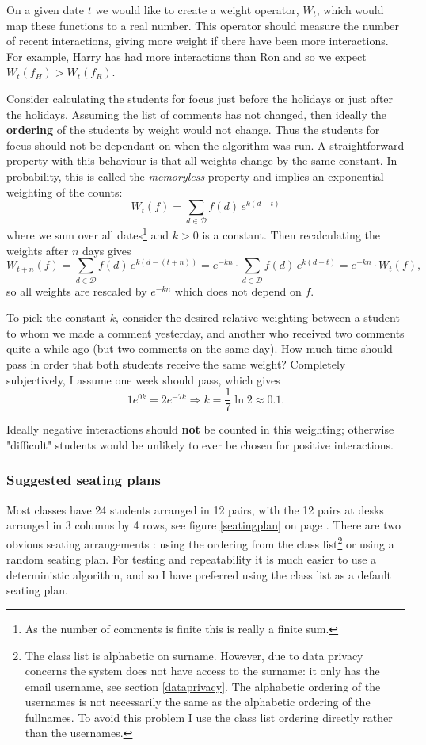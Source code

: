 \documentclass[10pt]{article}
\begin{document}
On a given date $t$ we would like to create a weight operator, $W_t$, which would map these functions to a real number. This operator should measure the number of recent interactions, giving more weight if there have been more interactions. For example, Harry has had more interactions than Ron and so we expect $W_t(f_H) > W_t(f_R)$.

Consider calculating the students for focus just before the holidays or just after the holidays. Assuming the list of comments has not changed, then ideally the \textbf{ordering} of the students by weight would not change. Thus the students for focus should not be dependant on when the algorithm was run. A straightforward property with this behaviour is that all weights change by the same constant. In probability, this is called the \emph{memoryless} property \cite{Norr98} and implies an exponential weighting of the counts:
$$ W_t(f) = \sum_{d \in \mathcal{D}} f(d) \, e^{k(d-t)} $$
where we sum over all dates\footnote{As the number of comments is finite this is really a finite sum.}  and $k>0$ is a constant. Then recalculating the weights after $n$ days gives
$$W_{t+n}(f) = \sum_{d \in \mathcal{D}} f(d) \, e^{k(d-(t+n))} =  e^{-kn} \cdot \sum_{d \in \mathcal{D}} f(d) \, e^{k(d-t)} = e^{-kn} \cdot  W_t(f),$$
so all weights are rescaled by $e^{-kn}$ which does not depend on $f$.

To pick the constant $k$, consider the desired relative weighting between a student to whom we made a comment yesterday, and another who received two comments quite a while ago (but two comments on the same day). How much time should pass in order that both students receive the same weight? Completely subjectively, I assume one week should pass, which gives
$$1 e^{0k} = 2 e^{-7k} \Rightarrow k = \frac{1}{7} \ln {2}  \approx 0.1.$$ 

Ideally negative interactions should \textbf{not} be counted in this weighting; otherwise "difficult" students would be unlikely to ever be chosen for positive interactions.

\subsubsection{Suggested seating plans}

Most classes have 24 students arranged in 12 pairs, with the 12 pairs at desks arranged in 3 columns by 4 rows, see figure \ref{seatingplan} on page \pageref{seatingplan}. There are two obvious seating arrangements : using the ordering from the class list\footnote{The class list is alphabetic on surname. However, due to data privacy concerns the system does not have access to the surname: it only has the email username, see section \ref{dataprivacy}. The alphabetic ordering of the usernames is not necessarily the same as the alphabetic ordering of the fullnames. To avoid this problem I use the class list ordering directly rather than the usernames.} or using a random seating plan. For testing and repeatability it is much easier to use a deterministic algorithm, and so I have preferred using the class list as a default seating plan.
\end{document}
